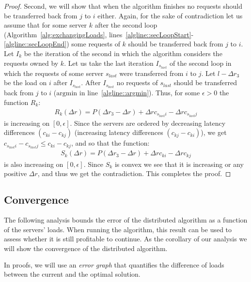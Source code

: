 \documentclass[11pt]{article}
\begin{document}
\begin{proof}
Second, we will show that when the algorithm finishes no requests should be transferred back from $j$ to $i$ either.
Again, for the sake of contradiction let us assume that for some server $k$ after the second loop (Algorithm~\ref{alg:exchangingLoads}, lines~\ref{algline::secLoopStart}-\ref{algline::secLoopEnd}) some requests of $k$ should be transferred back from $j$ to $i$.
Let $I_k$ be the iteration of the second in which the algorithm considers the requests owned by $k$.
Let us take the last iteration $I_{s_{\mathit{last}}}$ of the second loop in which the requests of some server $s_{\mathit{last}}$ were transferred from $i$ to $j$.
Let $l - \Delta r_3$ be the load on $i$ after $I_{s_{\mathit{last}}}$. 
After $I_{s_{\mathit{last}}}$ no requests of $s_{\mathit{last}}$ should be transferred back from $j$ to $i$ ($\mathrm{argmin}$ in line~\ref{algline::argmin}). Thus, for some $\epsilon > 0$ the function $R_k$:
\begin{align*}
R_k(\Delta r) = P(\Delta r_3 - \Delta r) + \Delta r c_{s_{\mathit{last}} i} - \Delta r c_{s_{\mathit{last}} j}
\end{align*}
is increasing on $[0, \epsilon]$. Since the servers are ordered by decreasing latency differences  $(c_{ki} - c_{kj})$ (increasing latency differences  $(c_{kj} - c_{ki})$), we get $c_{s_{\mathit{last}} i} - c_{s_{\mathit{last}} j} \leq c_{ki} - c_{kj}$, and so that the function: 
\begin{align*}
S_k(\Delta r) = P(\Delta r_3 - \Delta r) + \Delta r c_{k i} - \Delta r c_{k j}
\end{align*}
is also increasing on $[0, \epsilon]$. Since $S_k$ is convex we see that it is increasing or any positive $\Delta r$, and thus we get the contradiction. This completes the proof.
\end{proof}


\subsection{Convergence}\label{sec:convergence}
The following analysis bounds the error of the distributed algorithm as a function of the servers' loads. When running the algorithm, this result can be used to assess whether it is still profitable to continue. As the corollary of our analysis we will show the convergence of the distributed algorithm. 

In proofs, we will use an \emph{error graph} that quantifies the difference of loads between the current and the optimal solution.
\end{document}
